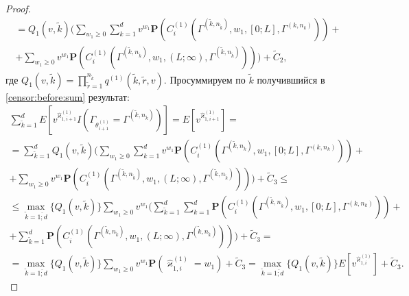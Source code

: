 \documentclass[12pt]{extarticle}
\theoremstyle{theorem}
\theoremstyle{remark}
\renewcommand{\Pr}{{\mathbf P}}
\begin{document}
\begin{proof}
\begin{multline}
  = Q_1(v,\tilde{k})  \biggl(\sum_{w_1\geqslant 0} \sum_{k=1}^d v^{w_1} \Pr(C_i^{(1)}(\Gamma^{(\tilde{k},n_{\tilde{k}})},w_1,[0;L],\Gamma^{(k,n_k)} )) + \\
   + \sum_{w_1\geqslant 0}  v^{w_1} \Pr(C_i^{(1)}(\Gamma^{(\tilde{k},n_{\tilde{k}})},w_1,(L;\infty),\Gamma^{(\tilde{k},n_{\tilde{k}})} ))\biggr) + \widetilde{C}_2,
   \label{censor:before:sum}
  \end{multline}
где $Q_1(v,\tilde{k})= \prod_{\tilde{r}=1}^{n_{\tilde{k}}} q^{(1)}(\tilde{k},\tilde{r},v) $. Просуммируем по $\tilde{k}$ получившийся в \eqref{censor:before:sum} результат:
\allowdisplaybreaks
\begin{multline*}
\sum_{\tilde{k}=1}^d E[v^{\hat{\varkappa}_{1,i+1}^{(1)}} I(\Gamma_{\theta_{i+1}^{(1)}}= \Gamma^{(\tilde{k},n_{\tilde{k}})})]=   E[v^{\hat{\varkappa}_{1,i+1}^{(1)}} ]=\\
  = \sum_{\tilde{k}=1}^d Q_1(v,\tilde{k})  \biggl(\sum_{w_1\geqslant 0} \sum_{k=1}^d v^{w_1} \Pr(C_i^{(1)}(\Gamma^{(\tilde{k},n_{\tilde{k}})},w_1,[0;L],\Gamma^{(k,n_k)} )) + \\
   + \sum_{w_1\geqslant 0}  v^{w_1} \Pr(C_i^{(1)}(\Gamma^{(\tilde{k},n_{\tilde{k}})},w_1,(L;\infty),\Gamma^{(\tilde{k},n_{\tilde{k}})} ))\biggr) + \widetilde{C}_3 \leqslant \\ \leqslant
   \max_{ \tilde{k}=\overline{1;d} }{\{Q_1(v,\tilde{k}) \}} \sum_{w_1\geqslant 0}  v^{w_1} \biggl(\sum_{\tilde{k}=1}^d \sum_{k=1}^d  \Pr(C_i^{(1)}(\Gamma^{(\tilde{k},n_{\tilde{k}})},w_1,[0;L],\Gamma^{(k,n_k)} )) + \\
   +  \sum_{\tilde{k}=1}^d \Pr(C_i^{(1)}(\Gamma^{(\tilde{k},n_{\tilde{k}})},w_1,(L;\infty),\Gamma^{(\tilde{k},n_{\tilde{k}})} ))\biggr) + \widetilde{C}_3 = \\
   =\max_{ \tilde{k}=\overline{1;d} }{\{Q_1(v,\tilde{k}) \}} \sum_{w_1\geqslant 0}  v^{w_1} \Pr(\hat{\varkappa}_{1,i}^{(1)}=w_1)+ \widetilde{C}_3=\max_{ \tilde{k}=\overline{1;d} }{\{Q_1(v,\tilde{k}) \}} E[v^{\hat{\varkappa}_{1,i}^{(1)}} ]+ \widetilde{C}_3.
  \end{multline*}


\end{proof}
\end{document}

